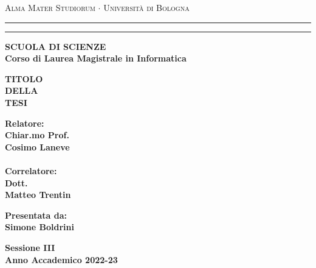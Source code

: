 \documentclass[../main.tex]{subfiles}
\begin{document}
\begin{titlepage}
\begin{center}
{{\Large{\textsc{Alma Mater Studiorum $\cdot$ Universit\`a di
Bologna}}}} \rule[0.1cm]{15.8cm}{0.1mm}
\rule[0.5cm]{15.8cm}{0.6mm}
{\small{\bf SCUOLA DI SCIENZE\\
Corso di Laurea Magistrale in Informatica}}
\end{center}
\vspace{15mm}
\begin{center}
{\LARGE{\bf TITOLO}}\\
\vspace{3mm}
{\LARGE{\bf DELLA}}\\
\vspace{3mm}
{\LARGE{\bf TESI}}\\
\end{center}
\vspace{40mm}
\par
\noindent
\begin{minipage}[t]{0.47\textwidth}
{\large{\bf Relatore:\\
Chiar.mo Prof.\\
Cosimo Laneve\\}}
{\large{\bf \\Correlatore:\\
Dott.\\ Matteo Trentin}
}
\end{minipage}
\hfill
\begin{minipage}[t]{0.47\textwidth}\raggedleft
{\large{\bf Presentata da:\\
Simone Boldrini}}
\end{minipage}
\vspace{20mm}
\begin{center}
{\large{\bf Sessione III\\%
Anno Accademico 2022-23}}%
\end{center}
\end{titlepage}
\end{document}
